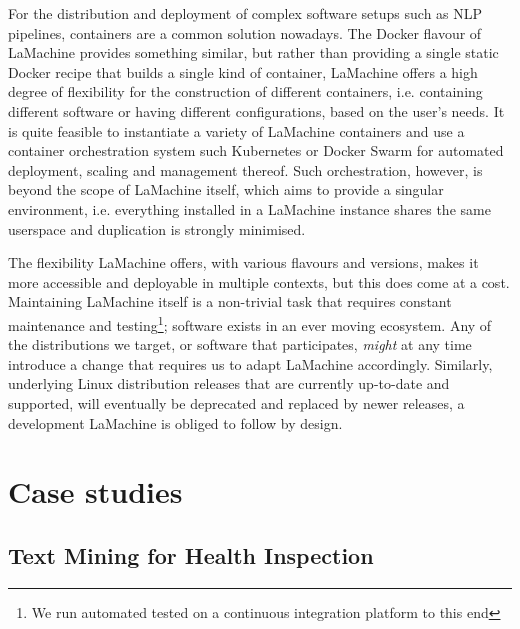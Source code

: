 \documentclass[a4paper,11pt]{article}
\begin{document}
For the distribution and deployment of complex software setups such as NLP pipelines, containers are a common solution
nowadays. The Docker flavour of LaMachine provides something similar, but rather than providing a single static Docker recipe
that builds a single kind of container, LaMachine offers a high degree of flexibility for the construction of different
containers, i.e. containing different software or having different configurations, based on the user's needs. It is
quite feasible to instantiate a variety of LaMachine containers and use a container orchestration system such
Kubernetes or Docker Swarm for automated deployment, scaling and management thereof. Such orchestration, however, is
beyond the scope of LaMachine itself, which aims to provide a singular environment, i.e. everything installed in a
LaMachine instance shares the same userspace and duplication is strongly minimised.

The flexibility LaMachine offers, with various flavours and versions, makes it more accessible and deployable in
multiple contexts, but this does come at a cost. Maintaining LaMachine itself is a non-trivial task that requires
constant maintenance and testing\footnote{We run automated tested on a continuous integration platform to this end};
software exists in an ever moving ecosystem. Any of the distributions we target, or software that participates, \emph{might}
at any time introduce a change that requires us to adapt LaMachine accordingly. Similarly, underlying Linux
distribution releases that are currently up-to-date and supported, will eventually be deprecated and replaced by newer releases, a development
LaMachine is obliged to follow by design.

\section{Case studies}\label{sec:case}

\subsection{Text Mining for Health Inspection}
\end{document}
